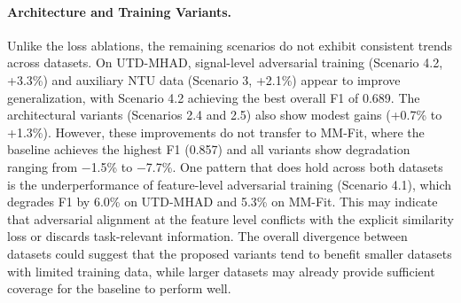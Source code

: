 \paragraph{Architecture and Training Variants.}
Unlike the loss ablations, the remaining scenarios do not exhibit consistent trends across datasets. On UTD-MHAD, signal-level adversarial training\cite{arjovsky2017wasserstein,gulrajani2017improved} (Scenario 4.2, +3.3\%) and auxiliary NTU data\cite{shahroudy2016ntu} (Scenario 3, +2.1\%) appear to improve generalization, with Scenario 4.2 achieving the best overall F1 of 0.689. The architectural variants (Scenarios 2.4 and 2.5) also show modest gains (+0.7\% to +1.3\%). However, these improvements do not transfer to MM-Fit, where the baseline achieves the highest F1 (0.857) and all variants show degradation ranging from $-$1.5\% to $-$7.7\%. One pattern that does hold across both datasets is the underperformance of feature-level adversarial training\cite{ganin2016domain} (Scenario 4.1), which degrades F1 by 6.0\% on UTD-MHAD and 5.3\% on MM-Fit. This may indicate that adversarial alignment at the feature level conflicts with the explicit similarity loss or discards task-relevant information. The overall divergence between datasets could suggest that the proposed variants tend to benefit smaller datasets with limited training data, while larger datasets may already provide sufficient coverage for the baseline to perform well.

